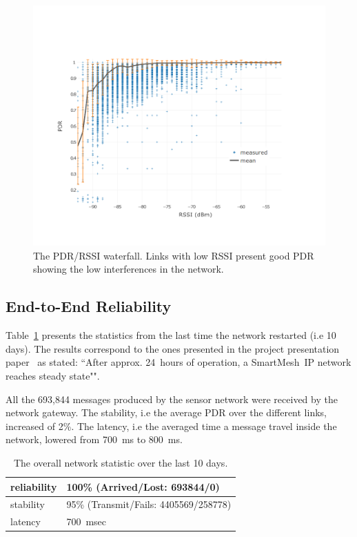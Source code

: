 \documentclass{sig-alternate}
\newcommand{\smip}           {SmartMesh~IP\xspace}
\begin{document}
\begin{figure}
    \centering
    \includegraphics[width=\columnwidth]{waterfall}
    \caption{
        The PDR/RSSI waterfall.
        Links with low RSSI present good PDR showing the low interferences in the network.
    }
    \label{fig:waterfall}
\end{figure}

\subsection{End-to-End Reliability}
\label{sec:net_reliability}


Table~\ref{tab:net_stats} presents the statistics from the last time the network restarted (i.e 10 days).
The results correspond to the ones presented in the project presentation paper~\cite{watteyne16peach} as stated:
``After approx. 24~hours of operation, a \smip network reaches steady state"".

All the 693,844 messages produced by the sensor network were received by the network gateway.
The stability, i.e the average PDR over the different links, increased of 2\%.
The latency, i.e the averaged time a message travel inside the network, lowered from 700~ms to 800~ms.

\begin{table}
    \begin{tabular}{|l|l|}
        \hline
        reliability & 100\% (Arrived/Lost:   693844/0)\\ \hline
        stability   & 95\% (Transmit/Fails: 4405569/258778)\\ \hline
        latency     & 700~msec\\
        \hline
    \end{tabular}
    \caption{The overall network statistic over the last 10 days.}
    \label{tab:net_stats}
\end{table}
\end{document}
